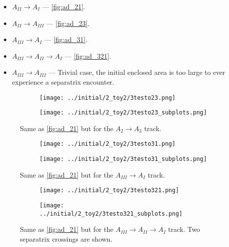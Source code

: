\documentclass[
        fleqn,
        usenatbib,
    ]{mnras}
\begin{document}
\begin{itemize}
    \item $A_{II} \to A_{I}$ --- \autoref{fig:ad_21}.
    \item $A_{II} \to A_{III}$ --- \autoref{fig:ad_23}.
    \item $A_{III} \to A_{I}$ --- \autoref{fig:ad_31}.
    \item $A_{III} \to A_{II} \to A_{I}$ --- \autoref{fig:ad_321}.
    \item $A_{III} \to A_{III}$ --- Trivial case, the initial enclosed area is
        too large to ever experience a separatrix encounter.
\end{itemize}
\begin{figure}
    \centering
    \begin{subfigure}{\columnwidth}
        \centering
        \texttt{[image: ../initial/2\_toy2/3testo23.png]}
    \end{subfigure}
    \begin{subfigure}{\columnwidth}
        \centering
        \texttt{[image: ../initial/2\_toy2/3testo23\_subplots.png]}
    \end{subfigure}
    \caption{Same as \autoref{fig:ad_21} but for the $A_2 \to A_3$ track.
    }\label{fig:ad_23}
\end{figure}
\begin{figure}
    \centering
    \begin{subfigure}{\columnwidth}
        \centering
        \texttt{[image: ../initial/2\_toy2/3testo31.png]}
    \end{subfigure}
    \begin{subfigure}{\columnwidth}
        \centering
        \texttt{[image: ../initial/2\_toy2/3testo31\_subplots.png]}
    \end{subfigure}
    \caption{Same as \autoref{fig:ad_21} but for the $A_{III} \to A_I$
    track.}\label{fig:ad_31}
\end{figure}
\begin{figure}
    \centering
    \begin{subfigure}{\columnwidth}
        \centering
        \texttt{[image: ../initial/2\_toy2/3testo321.png]}
    \end{subfigure}
    \begin{subfigure}{\columnwidth}
        \centering
        \texttt{[image: ../initial/2\_toy2/3testo321\_subplots.png]}
    \end{subfigure}
    \caption{Same as \autoref{fig:ad_21} but for the $A_{III} \to A_{II} \to A_I$
    track. Two separatrix crossings are shown.}\label{fig:ad_321}
\end{figure}
\end{document}
